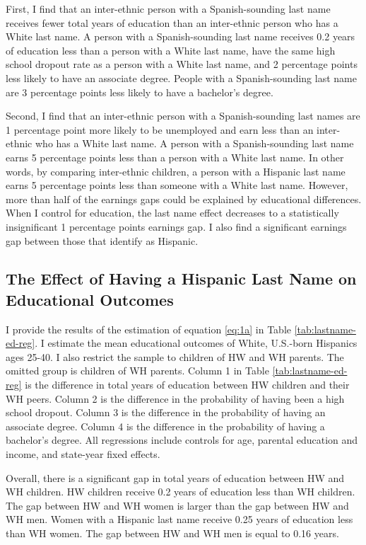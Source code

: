 First, I find that an inter-ethnic person with a Spanish-sounding last name receives fewer total years of education than an inter-ethnic person who has a White last name. A person with a Spanish-sounding last name receives 0.2 years of education less than a person with a White last name, have the same high school dropout rate as a person with a White last name, and 2 percentage points less likely to have an associate degree. People with a Spanish-sounding last name are 3 percentage points less likely to have a bachelor's degree.   

Second, I find that an inter-ethnic person with a Spanish-sounding last names are 1 percentage point more likely to be unemployed and earn less than an inter-ethnic who has a White last name. A person with a Spanish-sounding last name earns 5 percentage points less than a person with a White last name. In other words, by comparing inter-ethnic children, a person with a Hispanic last name earns 5 percentage points less than someone with a White last name. However, more than half of the earnings gaps could be explained by educational differences. When I control for education, the last name effect decreases to a statistically insignificant 1 percentage points earnings gap. I also find a significant earnings gap between those that identify as Hispanic. 

\subsection{The Effect of Having a Hispanic Last Name on Educational Outcomes}

I provide the results of the estimation of equation \ref{eq:1a} in Table \ref{tab:lastname-ed-reg}. I estimate the mean educational outcomes of White, U.S.-born Hispanics ages 25-40. I also restrict the sample to children of HW and WH parents. The omitted group is children of WH parents. Column 1 in Table \ref{tab:lastname-ed-reg} is the difference in total years of education between HW children and their WH peers. Column 2 is the difference in the probability of having been a high school dropout. Column 3 is the difference in the probability of having an associate degree. Column 4 is the difference in the probability of having a bachelor's degree. All regressions include controls for age, parental education and income, and state-year fixed effects.

Overall, there is a significant gap in total years of education between HW and WH children. HW children receive 0.2 years of education less than WH children. The gap between HW and WH women is larger than the gap between HW and WH men. Women with a Hispanic last name receive 0.25 years of education less than WH women. The gap between HW and WH men is equal to 0.16 years.

